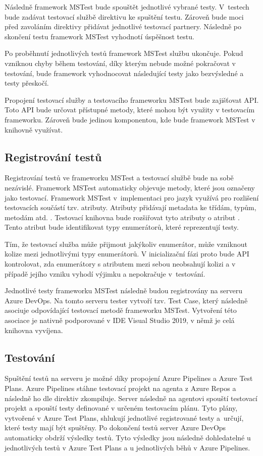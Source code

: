 Následně framework MSTest bude spouštět jednotlivé vybrané testy. V~testech bude zadávat testovací službě direktivu ke spuštění testu. Zároveň bude moci před zavoláním direktivy přidávat jednotlivé testovací partnery. Následně po skončení testu framework MSTest vyhodnotí úspěšnost testu.

Po proběhnutí jednotlivých testů framework MSTest službu ukončuje. Pokud vzniknou chyby během testování, díky kterým nebude možné pokračovat v testování, bude framework vyhodnocovat následující testy jako bezvýsledné a testy přeskočí.

Propojení testovací služby a testovacího frameworku MSTest bude zajišťovat API. Toto API bude určovat přístupné metody, které mohou být využity v testovacím frameworku. Zároveň bude jedinou komponentou, kde bude framework MSTest v knihovně využívat.

\subsection{Registrování testů}\label{sec:reg_test_design}
Registrování testů ve frameworku MSTest a testovací službě bude na sobě nezávislé. Framework MSTest automaticky objevuje metody, které jsou označeny jako testovací. Framework MSTest v~implementaci pro jazyk \csharp{} využívá pro rozlišení testovacích součástí tzv. atributy. Atributy přidávají metadata ke třídám, typům, metodám atd. \cite{attribute_docs}. Testovací knihovna bude rozšiřovat tyto atributy o atribut . Tento atribut bude identifikovat typy enumerátorů, které reprezentují testy. 

Tím, že testovací služba může přijmout jakýkoliv enumerátor, může vzniknout kolize mezi jednotlivými typy enumerátorů. V inicializační fázi proto bude API kontrolovat, zda enumerátory s atributem  mezi sebou neobsahují kolizi a v případě jejího vzniku vyhodí výjimku a nepokračuje v~testování.

Jednotlivé testy frameworku MSTest následně budou registrovány na serveru Azure DevOps. Na tomto serveru tester vytvoří tzv. Test Case, který následně asociuje odpovídající testovací metodě frameworku MSTest. Vytvoření této asociace je nativně podporované v IDE Visual Studio 2019, v němž je celá knihovna vyvíjena. 


\subsection{Testování}
Spuštění testů na serveru je možné díky propojení Azure Pipelines a Azure Test Plans. Azure Pipelines stáhne testovací projekt na agenta z Azure Repos a následně ho dle direktiv zkompiluje. Server následně na agentovi spouští testovací projekt a spouští testy definované v určeném testovacím plánu. Tyto plány, vytvořené v Azure Test Plans, shlukují jednotlivé registrované testy a~určují, které testy mají být spuštěny. Po dokončení testů server Azure DevOps automaticky obdrží výsledky testů. Tyto výsledky jsou následně dohledatelné u jednotlivých testů v Azure Test Plans a u jednotlivých běhů v Azure Pipelines. 


